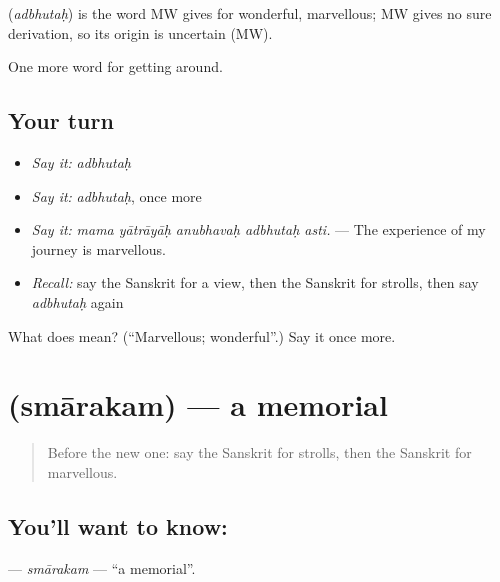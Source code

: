 \begin{cousinweb}
\textbf{} (\emph{adbhutaḥ}) is the word MW gives for wonderful, marvellous; MW gives no sure derivation, so its origin is uncertain (MW).
\end{cousinweb}

\begin{grammarlens}[title={What you've built}]
One more word for getting around.
\end{grammarlens}

\subsection*{Your turn}
\begin{itemize}
\raggedright
  \item \emph{Say it:} \emph{adbhutaḥ}
  \item \emph{Say it:} \emph{adbhutaḥ}, once more
  \item \emph{Say it:} \emph{mama yātrāyāḥ anubhavaḥ adbhutaḥ asti.} — The experience of my journey is marvellous.
  \item \emph{Recall:} say the Sanskrit for a view, then the Sanskrit for strolls, then say \emph{adbhutaḥ} again
\end{itemize}

\begin{tcolorbox}[breakable,colback=teal!4,colframe=teal!35!black,title={Before you move on}]
What does  mean? (\textquotedblleft{}Marvellous; wonderful\textquotedblright{}.) Say it once more.
\end{tcolorbox}
\section[\texorpdfstring{\sk{स्मारकम्} (smārakam)}{स्मारकम् (smārakam)}]{ (smārakam) — a memorial}

\label{lesson:SA-C425-smarakam}



\begin{quote}
Before the new one: say the Sanskrit for strolls, then the Sanskrit for marvellous.
\end{quote}

\subsection*{You'll want to know: }
\textbf{} — \emph{smārakam} — \textquotedblleft{}a memorial\textquotedblright{}.

